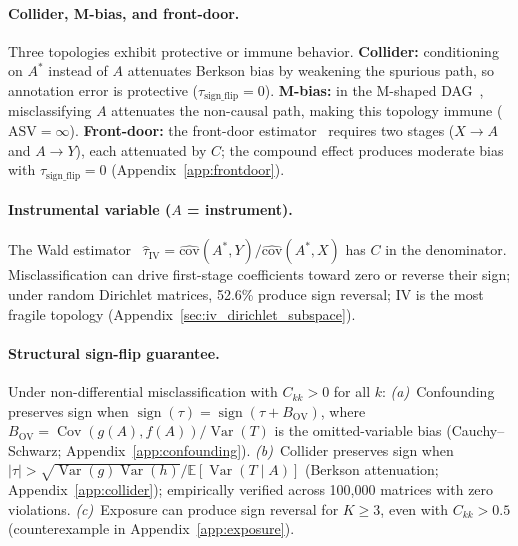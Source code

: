 \paragraph{Collider, M-bias, and front-door.}
Three topologies exhibit protective or immune behavior. \textbf{Collider:} conditioning on $A^*$ instead of $A$ attenuates Berkson bias by weakening the spurious path, so annotation error is protective ($\tau_{\text{sign\_flip}} = 0$). \textbf{M-bias:} in the M-shaped DAG~\cite{greenland2003}, misclassifying $A$ attenuates the non-causal path, making this topology immune ($\text{ASV} = \infty$). \textbf{Front-door:} the front-door estimator~\cite{bellemare_bloem2024} requires two stages ($X \to A$ and $A \to Y$), each attenuated by $C$; the compound effect produces moderate bias with $\tau_{\text{sign\_flip}} = 0$ (Appendix~\ref{app:frontdoor}).

\paragraph{Instrumental variable ($A$ = instrument).}
The Wald estimator~\cite{angrist_imbens1995} $\hat{\tau}_{\text{IV}} = \hat{\text{cov}}(A^*, Y) / \hat{\text{cov}}(A^*, X)$ has $C$ in the denominator. Misclassification can drive first-stage coefficients toward zero or reverse their sign; under random Dirichlet matrices, 52.6\% produce sign reversal; IV is the most fragile topology (Appendix~\ref{sec:iv_dirichlet_subspace}).

\paragraph{Structural sign-flip guarantee.}
\begin{proposition}
\label{prop:signflip}
Under non-differential misclassification with $C_{kk} > 0$ for all $k$:
\emph{(a)}~Confounding preserves sign when $\operatorname{sign}(\tau) = \operatorname{sign}(\tau {+} B_{\mathrm{OV}})$, where $B_{\mathrm{OV}} {=} \operatorname{Cov}(g(A),f(A))/\operatorname{Var}(T)$ is the omitted-variable bias (Cauchy--Schwarz; Appendix~\ref{app:confounding}).
\emph{(b)}~Collider preserves sign when $|\tau| > \sqrt{\operatorname{Var}(g)\operatorname{Var}(h)}/\mathbb{E}[\operatorname{Var}(T{\mid}A)]$ (Berkson attenuation; Appendix~\ref{app:collider}); empirically verified across 100{,}000 matrices with zero violations.
\emph{(c)}~Exposure can produce sign reversal for $K {\geq} 3$, even with $C_{kk} {>} 0.5$ (counterexample in Appendix~\ref{app:exposure}).
\end{proposition}

